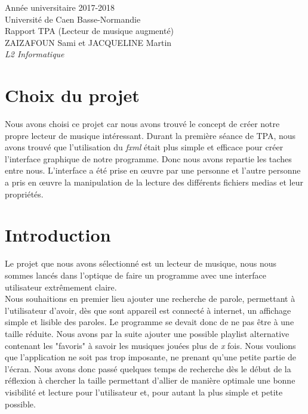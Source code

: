 \documentclass[a4paper,12pt]{report} %
\begin{document}




\begin{titlepage}
	\begin{center}
		\Huge{Année universitaire 2017-2018}\\
		\Huge{Université de Caen Basse-Normandie}\\[7cm]	
		
		\Large{Rapport TPA (Lecteur de musique augmenté)}\\[2cm]
		\normalsize{ZAIZAFOUN Sami et JACQUELINE Martin}\\[0.5cm]
		\small{\textit{L2 Informatique}}
		\medskip
		\vspace{5cm}
	\end{center}
\end{titlepage}




\newpage
\tableofcontents
\newpage


\section{Choix du projet}

	Nous avons choisi ce projet car nous avons trouvé le concept de créer notre propre lecteur de musique intéressant. Durant la première séance de TPA, nous avons trouvé que l’utilisation du \textit{fxml} était plus simple et efficace pour créer l’interface graphique de notre programme. Donc nous avons repartie les taches entre nous. L’interface a été prise en œuvre par une personne et l’autre personne a pris en œuvre la manipulation de la lecture des différents fichiers medias et leur propriétés.
	
\section{Introduction}

	Le projet que nous avons sélectionné est un lecteur de musique, nous nous sommes lancés dans l'optique de faire un programme avec une interface utilisateur extrêmement claire.\\
	
	Nous souhaitions en premier lieu ajouter une recherche de parole, permettant à l'utilisateur d'avoir, dès que sont appareil est connecté à internet, un affichage simple et lisible des paroles. Le programme se devait donc de ne pas être à une taille réduite. 
	Nous avons par la suite ajouter une possible playlist alternative contenant les "favoris" à savoir les musiques jouées plus de \textit{x} fois. Nous voulions que l'application ne soit pas trop imposante, ne prenant qu'une petite partie de l'écran. 
	Nous avons donc passé quelques temps de recherche dès le début de la réflexion à chercher la taille permettant d'allier de manière optimale une bonne visibilité et lecture pour l'utilisateur et, pour autant la plus simple et petite possible.\\
	
\end{document}
